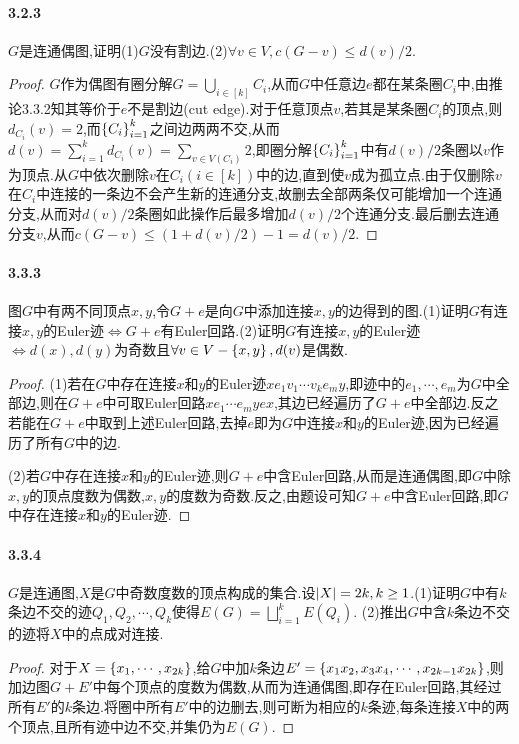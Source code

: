 \documentclass[11pt]{article}
\begin{document}
\paragraph{3.2.3}$G$是连通偶图,证明(1)$G$没有割边.(2)$\forall v\in V, c(G-v)\leq d(v)/2$.
\begin{proof}
$G$作为偶图有圈分解$G=\bigcup_{i\in [k]}C_i$,从而$G$中任意边$e$都在某条圈$C_i$中,由推论3.3.2知其等价于$e$不是割边(cut edge).对于任意顶点$v$,若其是某条圈$C_i$的顶点,则$d_{C_i}(v)=2$,而$\left\{C_i\right\}_{i=1}^k$之间边两两不交,从而$d(v)=\sum_{i=1}^k d_{C_i}(v)=\sum_{v\in V(C_i)}2$,即圈分解$\left\{C_i\right\}_{i=1}^k$中有$d(v)/2$条圈以$v$作为顶点.从$G$中依次删除$v$在$C_i(i\in [k])$中的边,直到使$v$成为孤立点.由于仅删除$v$在$C_i$中连接的一条边不会产生新的连通分支,故删去全部两条仅可能增加一个连通分支,从而对$d(v)/2$条圈如此操作后最多增加$d(v)/2$个连通分支.最后删去连通分支$v$,从而$c(G-v)\leq (1+d(v)/2)-1=d(v)/2$.
\end{proof}

\paragraph{3.3.3}图$G$中有两不同顶点$x,y$,令$G+e$是向$G$中添加连接$x,y$的边得到的图.(1)证明$G$有连接$x,y$的Euler迹$\iff G+e$有Euler回路.(2)证明$G$有连接$x,y$的Euler迹$\iff d(x),d(y)$为奇数且$\forall v\in V-\left\{x,y\right\}, d(v)$是偶数.
\begin{proof}
(1)若在$G$中存在连接$x$和$y$的Euler迹$x e_1 v_1\cdots v_k e_m y$,即迹中的$e_1,\cdots,e_m$为$G$中全部边,则在$G+e$中可取Euler回路$x e_1 \cdots e_m y e x$,其边已经遍历了$G+e$中全部边.反之若能在$G+e$中取到上述Euler回路,去掉$e$即为$G$中连接$x$和$y$的Euler迹,因为已经遍历了所有$G$中的边.

(2)若$G$中存在连接$x$和$y$的Euler迹,则$G+e$中含Euler回路,从而是连通偶图,即$G$中除$x,y$的顶点度数为偶数,$x,y$的度数为奇数.反之,由题设可知$G+e$中含Euler回路,即$G$中存在连接$x$和$y$的Euler迹.
\end{proof}

\paragraph{3.3.4}$G$是连通图,$X$是$G$中奇数度数的顶点构成的集合.设$\left|X\right|=2k, k\geq 1$.(1)证明$G$中有$k$条边不交的迹$Q_1,Q_2,\cdots,Q_k$使得$E(G)=\bigsqcup_{i=1}^k E(Q_i)$. (2)推出$G$中含$k$条边不交的迹将$X$中的点成对连接.
\begin{proof}
对于$X=\left\{x_1,\cdots,x_{2k}\right\}$,给$G$中加$k$条边$E'=\left\{x_1x_2,x_3x_4,\cdots,x_{2k-1}x_{2k}\right\}$,则加边图$G+E'$中每个顶点的度数为偶数,从而为连通偶图,即存在Euler回路,其经过所有$E'$的$k$条边.将圈中所有$E'$中的边删去,则可断为相应的$k$条迹,每条连接$X$中的两个顶点,且所有迹中边不交,并集仍为$E(G)$.
\end{proof}
\end{document}
